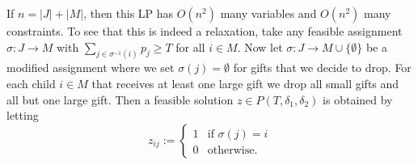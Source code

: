If $n = |J| + |M|$, then this LP has $O(n^2)$ many variables and $O(n^2)$
many constraints. To see that this is indeed a relaxation, take any feasible assignment $\sigma : J \to M$ with $\sum_{j \in \sigma^{-1}(i)} p_j \geq T$ for all $i \in M$. 
Now let $\sigma : J \to M \cup \{ \emptyset \}$ be a modified 
assignment where we set $\sigma(j) = \emptyset$ for gifts that we decide to drop. For each child $i \in M$ that receives at least one large gift 
we drop all small gifts and all but one large gift. 
Then a feasible solution $z \in P(T,\delta_1,\delta_2)$ is obtained by letting  
\[ 
  z_{ij} := \begin{cases} 
 1 & \textrm{if }\sigma(j) = i \\
0 & \textrm{otherwise}.
\end{cases}
\]






